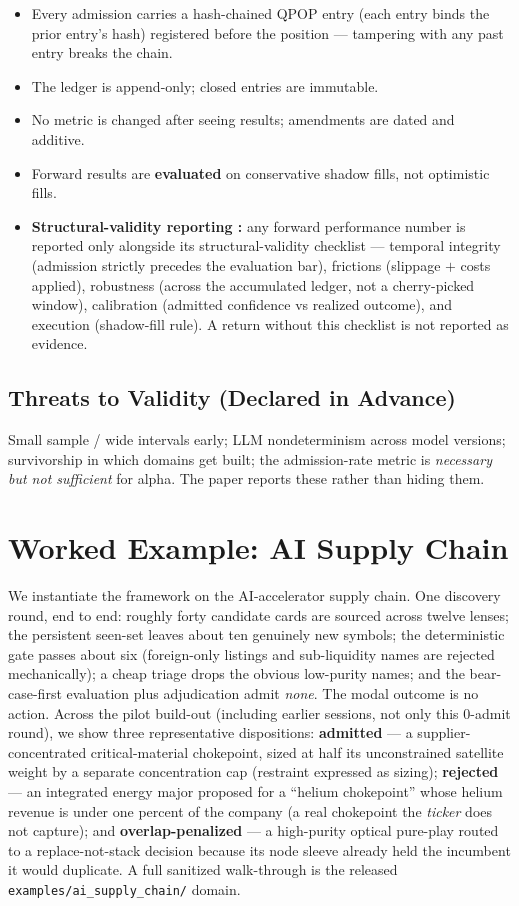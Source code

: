 \documentclass[11pt]{article}
\begin{document}
\begin{itemize}
  \item Every admission carries a hash-chained QPOP entry (each entry binds the prior entry's
    hash) registered before the position --- tampering with any past entry breaks the chain.
  \item The ledger is append-only; closed entries are immutable.
  \item No metric is changed after seeing results; amendments are dated and additive.
  \item Forward results are \textbf{evaluated} on conservative shadow fills, not optimistic fills.
  \item \textbf{Structural-validity reporting \citep{ye2026alphaillusion}:} any forward
    performance number is reported only alongside its structural-validity checklist ---
    temporal integrity (admission strictly precedes the evaluation bar), frictions (slippage
    $+$ costs applied), robustness (across the accumulated ledger, not a cherry-picked window),
    calibration (admitted confidence vs realized outcome), and execution (shadow-fill rule).
    A return without this checklist is not reported as evidence.
\end{itemize}

\subsection*{Threats to Validity (Declared in Advance)}

Small sample / wide intervals early; LLM nondeterminism across model versions; survivorship in
which domains get built; the admission-rate metric is \emph{necessary but not sufficient} for
alpha. The paper reports these rather than hiding them.

\section{Worked Example: AI Supply Chain}
We instantiate the framework on the AI-accelerator supply chain. One discovery round, end to end:
roughly forty candidate cards are sourced across twelve lenses; the persistent seen-set leaves about
ten genuinely new symbols; the deterministic gate passes about six (foreign-only listings and
sub-liquidity names are rejected mechanically); a cheap triage drops the obvious low-purity names; and
the bear-case-first evaluation plus adjudication admit \emph{none}. The modal outcome is no action.
Across the pilot build-out (including earlier sessions, not only this 0-admit round), we show three
representative dispositions: \textbf{admitted} --- a supplier-concentrated
critical-material chokepoint, sized at half its unconstrained satellite weight by a separate
concentration cap (restraint expressed as sizing); \textbf{rejected} --- an integrated energy major
proposed for a ``helium chokepoint'' whose helium revenue is under one percent of the company (a real
chokepoint the \emph{ticker} does not capture); and \textbf{overlap-penalized} --- a high-purity
optical pure-play routed to a replace-not-stack decision because its node sleeve already held the
incumbent it would duplicate. A full sanitized walk-through is the released
\texttt{examples/ai\_supply\_chain/} domain.
\end{document}
